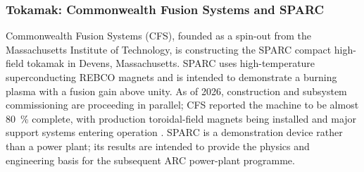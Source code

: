 \documentclass[a4paper]{article}
\begin{document}
\pagebreak
\subsubsection{Tokamak: Commonwealth Fusion Systems and SPARC}
Commonwealth Fusion Systems (CFS), founded as a spin-out from the Massachusetts Institute of Technology, is constructing the SPARC compact high-field tokamak in Devens, Massachusetts. SPARC uses high-temperature superconducting REBCO magnets and is intended to demonstrate a burning plasma with a fusion gain above unity. As of 2026, construction and subsystem commissioning are proceeding in parallel; CFS reported the machine to be almost 80~\% complete, with production toroidal-field magnets being installed and major support systems entering operation \cite{CFS2026SPARC}. SPARC is a demonstration device rather than a power plant; its results are intended to provide the physics and engineering basis for the subsequent ARC power-plant programme.
\end{document}
